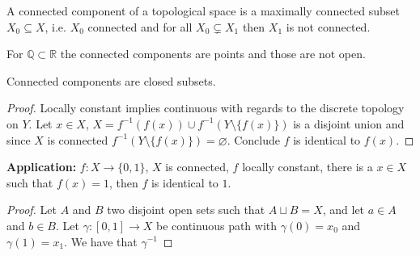 \begin{defbox}
    \begin{definition}
        A connected component of a topological space is a maximally connected subset \(X_0 \subseteq X\), i.e. \(X_0\) connected and for all \(X_0 \subsetneq X_1\) then \(X_1\) is not connected.
    \end{definition}
\end{defbox}
%
\begin{example}
    For \(\mathbb{Q} \subset \mathbb{R}\) the connected components are points and those are not open.
\end{example}
%
\begin{thmbox}
    \begin{proposition}
        Connected components are closed subsets.
    \end{proposition}
\end{thmbox}
%

\begin{proof}
    Locally constant implies continuous with regards to the discrete topology on \(Y\). Let \(x \in X\), \(X = f^{-1}(f(x)) \cup f^{-1}(Y \setminus \{f(x)\})\) is a disjoint union and since \(X\) is connected \(f^{-1}(Y \setminus \{f(x)\}) = \varnothing\). Conclude \(f\) is identical to \(f(x)\).
\end{proof}

\textbf{Application:} \(f: X \longrightarrow \{0, 1\}\), \(X\) is connected, \(f\) locally constant, there is a \(x \in X\) such that \(f(x) = 1\), then \(f\) is identical to \(1\).

\begin{proof}
    Let \(A\) and \(B\) two disjoint open sets such that \(A \sqcup B = X\), and let \(a \in A\) and \(b \in B\). Let \(\gamma: [0, 1] \longrightarrow X\) be continuous path with \(\gamma(0) = x_0\) and \(\gamma(1) = x_1\). We have that \(\gamma^{-1}\)
\end{proof}

\newpage
